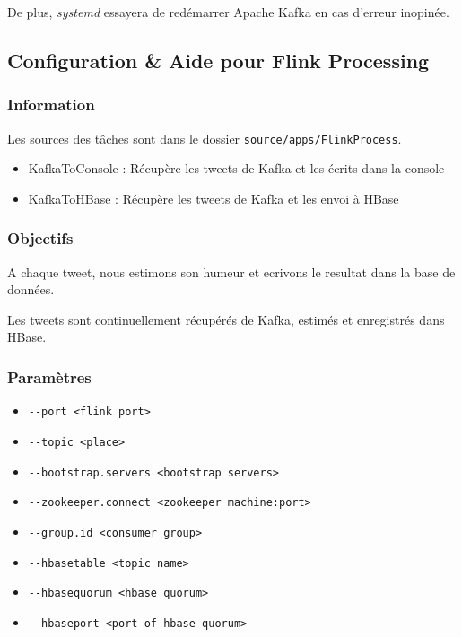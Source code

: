 \documentclass[a4paper,oneside,12pt]{article}
\begin{document}
De plus, \textit{systemd} essayera de redémarrer Apache Kafka en cas d'erreur
inopinée.

\pagebreak
\subsection{Configuration \& Aide pour Flink Processing}

\subsubsection{Information}

Les sources des tâches sont dans le dossier \verb!source/apps/FlinkProcess!. 

\begin{itemize}
\item KafkaToConsole : Récupère les tweets de Kafka et les écrits dans la console
\item KafkaToHBase : Récupère les tweets de Kafka et les envoi à HBase
\end{itemize}

\subsubsection{Objectifs}

A chaque tweet, nous estimons son humeur et ecrivons le resultat dans la base de données. 

Les tweets sont continuellement récupérés de Kafka, estimés et enregistrés dans HBase. 

\subsubsection{Paramètres}

\begin{itemize}
\item \verb!--port <flink port>! 
\item \verb!--topic <place>!
\item \verb!--bootstrap.servers <bootstrap servers>!
\item \verb!--zookeeper.connect <zookeeper machine:port>!
\item \verb!--group.id <consumer group>!
\item \verb!--hbasetable <topic name>!
\item \verb!--hbasequorum <hbase quorum>!
\item \verb!--hbaseport <port of hbase quorum>!
\end{itemize}
\end{document}

